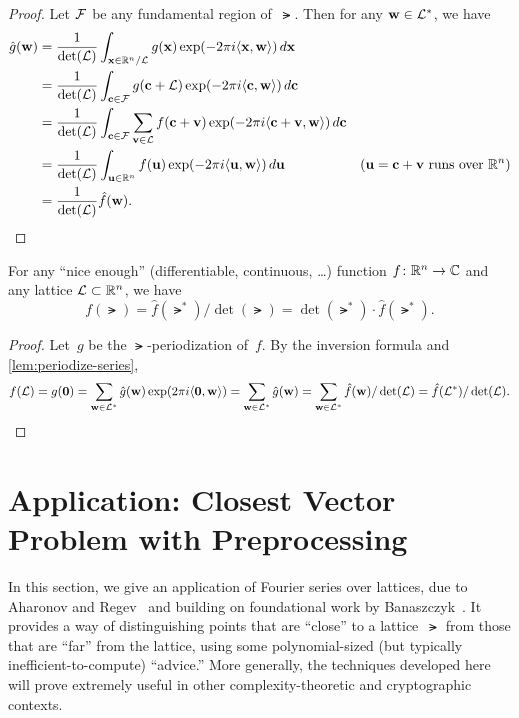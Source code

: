 \documentclass[11pt]{article}
\begin{document}
\begin{proof}
  Let $\cal{F}$ be any fundamental region of~$\lat$. Then for any
  $\vecw \in \lat^{*}$, we have
  \begin{align*}
    \hat{g}(\vecw)
    &= \frac{1}{\det(\lat)} \int_{\vecx \in \R^n/\lat} g(\vecx) \exp(-
      2 \pi i  \inner{\vecx,\vecw}) \, d\vecx  \\
    &= \frac{1}{\det(\lat)} \int_{\vecc \in \cal{F}} g(\vecc + \lat) \exp(-
      2 \pi i  \inner{\vecc,\vecw}) \, d\vecc  \\
    &= \frac{1}{\det(\lat)} \int_{\vecc \in \cal{F}} \sum_{\vecv \in
      \lat} f(\vecc + \vecv) \exp(- 2 \pi i \inner{\vecc +
      \vecv,\vecw}) \, d\vecc \\
    &= \frac{1}{\det(\lat)} \int_{\vecu \in \R^{n}} f(\vecu) \exp(-2
      \pi i \inner{\vecu,\vecw}) \, d\vecu
    & \text{($\vecu=\vecc+\vecv$ runs over $\R^{n}$)} \\
    &= \frac{1}{\det(\lat)} \hat{f}(\vecw).
  \end{align*}

\end{proof}

\begin{lemma}
  \label{lem:psf}
  For any ``nice enough'' (differentiable, continuous, \ldots)
  function $f \colon \R^n \to \C$ and any lattice
  $\lat \subset \R^{n}$, we have
  \[ f(\lat) = \hat{f}(\lat^{*}) / \det(\lat) = \det(\lat^*) \cdot
    \hat{f}(\lat^*). \]
\end{lemma}

\begin{proof}
  Let~$g$ be the $\lat$-periodization of~$f$. By the inversion formula
  and \cref{lem:periodize-series},
  \[ f(\lat) = g(\mathbf{0}) = \sum_{\vecw \in \lat^*}
    \hat{g}(\vecw)\exp(2 \pi i \inner{\mathbf{0},\vecw}) = \sum_{\vecw
      \in \lat^*} \hat{g}(\vecw) = \sum_{\vecw \in \lat^{*}}
    \hat{f}(\vecw)/\det(\lat) = \hat{f}(\lat^{*}) / \det(\lat). \]
\end{proof}

\section{Application: Closest Vector Problem with Preprocessing}

In this section, we give an application of Fourier series over
lattices, due to Aharonov and
Regev~\cite{DBLP:journals/jacm/AharonovR05} and building on
foundational work by Banaszczyk~\cite{banaszczyk93:_new}. It provides
a way of distinguishing points that are ``close'' to a lattice~$\lat$
from those that are ``far'' from the lattice, using some
polynomial-sized (but typically inefficient-to-compute) ``advice.''
More generally, the techniques developed here will prove extremely
useful in other complexity-theoretic and cryptographic contexts.
\end{document}
